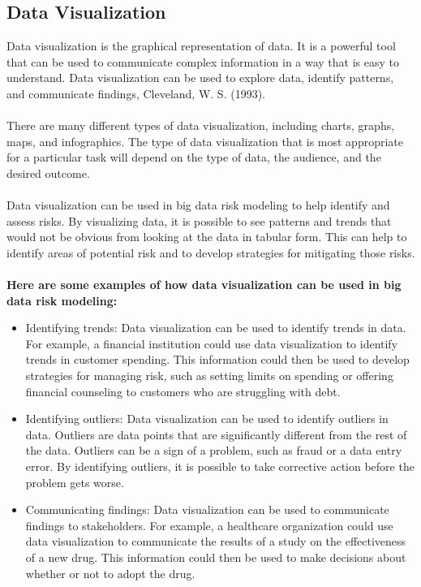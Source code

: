 \subsection{Data Visualization}
Data visualization is the graphical representation of data. It is a powerful tool that can be used to communicate 
complex information in a way that is easy to understand. Data visualization can be used to explore data, identify 
patterns, and communicate findings, Cleveland, W. S. (1993).\\\\
There are many different types of data visualization, including charts, graphs, maps, and infographics. The type of 
data visualization that is most appropriate for a particular task will depend on the type of data, the audience, and 
the desired outcome.\\\\
Data visualization can be used in big data risk modeling to help identify and assess risks. By visualizing data, it 
is possible to see patterns and trends that would not be obvious from looking at the data in tabular form. This can 
help to identify areas of potential risk and to develop strategies for mitigating those risks.\\\\
\textbf{Here are some examples of how data visualization can be used in big data risk modeling:}
\begin{itemize}
\item Identifying trends: Data visualization can be used to identify trends in data. For example, a financial institution could use data visualization to identify trends in customer spending. This information could then be used to develop strategies for managing risk, such as setting limits on spending or offering financial counseling to customers who are struggling with debt.
\item Identifying outliers: Data visualization can be used to identify outliers in data. Outliers are data points that are significantly different from the rest of the data. Outliers can be a sign of a problem, such as fraud or a data entry error. By identifying outliers, it is possible to take corrective action before the problem gets worse.
\item Communicating findings: Data visualization can be used to communicate findings to stakeholders. For example, a healthcare organization could use data visualization to communicate the results of a study on the effectiveness of a new drug. This information could then be used to make decisions about whether or not to adopt the drug.
\end{itemize}

